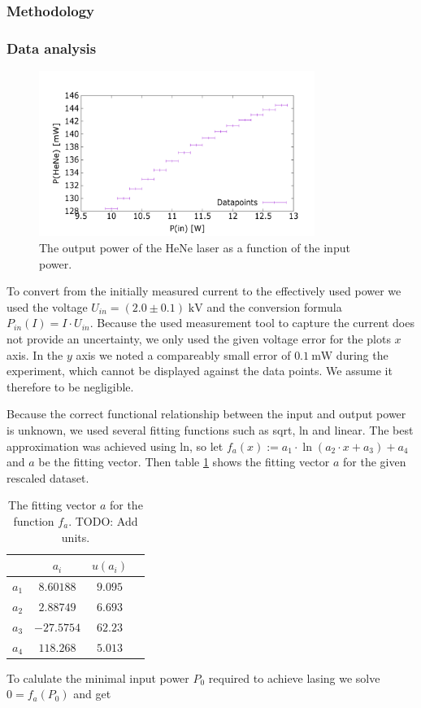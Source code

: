 \documentclass[../main.tex]{subfiles}
\begin{document}
\subsubsection*{Methodology}
\subsubsection*{Data analysis}

    \begin{figure}
        \centering
        \includegraphics[width=0.8\textwidth]{Bilddateien/2/P(HeNe)overP(in).png}
        \caption{The output power of the HeNe laser as a function of the input power.}
    \end{figure}

    To convert from the initially measured current to the effectively used power we used the voltage $U_{\textit{in}} = (2.0\pm 0.1)\;\si{\kV}$ and the conversion formula $P_{\textit{in}}(I) = I \cdot U_{\textit{in}}$. Because the used measurement tool to capture the current does not provide an uncertainty, we only used the given voltage error for the plots $x$ axis. In the $y$ axis we noted a compareably small error of $\SI{0.1}{\mW}$ during the experiment, which cannot be displayed against the data points. We assume it therefore to be negligible. 

    Because the correct functional relationship between the input and output power is unknown, we used several fitting functions such as sqrt, ln and linear. The best approximation was achieved using ln, so let $f_a(x) := a_1\cdot \ln(a_2\cdot x + a_3) + a_4$ and $a$ be the fitting vector. Then table \ref{tab:fitting_vector_logfit} shows the fitting vector $a$ for the given rescaled dataset. 

    \begin{table}[H]
        \centering
        \begin{tabular}{|c|c|c|c}
            \hline
             & $a_i$ & $u(a_i)$ \\
            \hline\hline
            $a_1$ & $8.60188$ & $9.095$ \\
            $a_2$ & $2.88749$ & $6.693$ \\
            $a_3$ & $-27.5754$ & $62.23$ \\
            $a_4$ & $118.268$ & $5.013$ \\
            \hline
        \end{tabular}
        \caption{The fitting vector $a$ for the function $f_a$. \color{red}TODO: Add units.}
        \label{tab:fitting_vector_logfit}
    \end{table}

    To calulate the minimal input power $P_0$ required to achieve lasing we solve $0 = f_a(P_0)$ and get 
\end{document}
